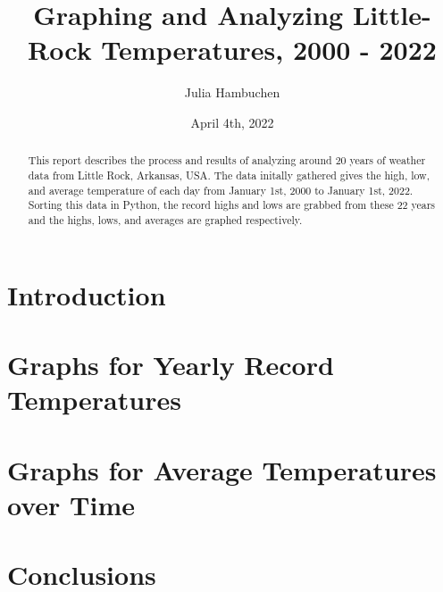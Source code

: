 \documentclass{article}
\begin{document}
\title{Graphing and Analyzing Little-Rock Temperatures, 2000 - 2022}
\author{Julia Hambuchen}
\date{April 4th, 2022}
\maketitle

\begin{abstract}
This report describes the process and results of analyzing around 20 years of weather data from Little Rock, Arkansas, USA. The data initally gathered gives the high, low, and average temperature of each day from January 1st, 2000 to January 1st, 2022. Sorting this data in Python, the record highs and lows are grabbed from these 22 years and the highs, lows, and averages are graphed respectively.
\end{abstract}

\section{Introduction}


\section{Graphs for Yearly Record Temperatures}


\section{Graphs for Average Temperatures over Time}


\section{Conclusions}




\end{document}
